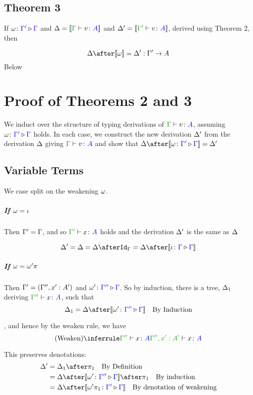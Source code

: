\documentclass{report}
\begin{document}
\subsection{Theorem 3}

If $\omega \colon {\color{blue}\Gamma'} \triangleright {\color {blue} \Gamma}$ and $\D = \deno{\gtyperelation{v}{A}}$ and $\D' = \deno{\typerelation{\G'}{v}{A}}$, derived using Theorem 2, then 

$$
    \D \after \deno{\w} = \D' : \G' \rightarrow A
$$
\proof Below

\section{Proof of Theorems 2 and 3}
We induct over the structure of typing derivations of $\gtyperelation{v}{A}$, assuming $\omega \colon {\color{blue}\Gamma'} \triangleright {\color {blue} \Gamma}$ holds. In each case, we construct the new derivation $\Delta'$ from the derivation $\Delta$ giving $\gtyperelation{v}{A}$ and show that $\D\after\deno{\wrel{\w}{\G'}{\G}} = \D'$

\subsection{Variable Terms}
    We case split on the weakening $\omega$.
    \subparagraph{If $\omega = \iota$}
    Then $\Gamma' = \Gamma$, and so $\typerelation{\G'}{x}{A}$ holds and the derivation $\Delta'$ is the same as $\Delta$

    \begin{equation}
        \D' = \D = \D\after\idg = \D\after\deno{\wrel{\i}{\G}{\G}} 
    \end{equation}
    \subparagraph{If $\omega = \omega'\pi$}
    Then  $\Gamma' = (\Gamma'',x': A')$ and $\omega' \colon {\color{blue}\Gamma''} \triangleright {\color {blue} \Gamma}$. So by induction, there is a tree, $\Delta_1$ deriving $\typerelation{\G''}{x}{A}$,  such that 
    \begin{equation}
        \D_1 = \D\after\deno{\wrel{\w'}{\G''}{\G}} \qt{By Induction}
    \end{equation}
    
    , and hence by the weaken rule, we have 
    \begin{equation}
        \ntreeruleI{Weaken}{\typerelation{\G''}{x}{A}}{\typerelation{\G'', x':A' }{x}{A}}
    \end{equation}

    This preserves denotations:
    \begin{align*}
        \D' & = \D_1\after\p\qt{By Definition} \\
        & = \D\after\deno{\wrel{\w'}{\G''}{\G}}\after\p\qt{By induction}\\
        & = \D\after\deno{\wrel{\w'\p}{\G'}{\G}}\qt{By denotation of weakening}
    \end{align*}
\end{document}
